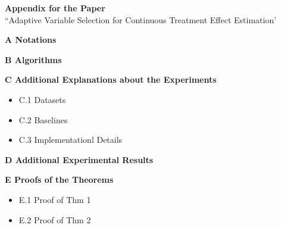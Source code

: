 \documentclass[twoside]{article}
\theoremstyle{plain}
\theoremstyle{definition}
\theoremstyle{remark}
\newtheorem{proof sketch}[theorem]{Proof Sketch}
\begin{document}
\begin{center}
  {\fontsize{16pt}{18pt}\selectfont\bfseries\color{darkblue} Appendix for the Paper} \\[0.6em]
  {\fontsize{14pt}{16pt}\selectfont \color{darkblue} ``Adaptive Variable Selection for Continuous Treatment Effect Estimation'} \\[1.5em]
\end{center}
{\color{darkblue}
\textbf{A \quad Notations}  
\vspace{-0.5em}  

\textbf{B \quad Algorithms}  
\vspace{0.5em}  

\textbf{C \quad Additional Explanations about the Experiments}  
\vspace{-0.5em}  
\begin{itemize}[leftmargin=1.5em, itemsep=0em]
    \item C.1 \quad Datasets
    \item C.2 \quad Baselines
    \item C.3 \quad Implementationl Details
\end{itemize}

\textbf{D \quad Additional Experimental Results} 
\vspace{0.5em}  

\textbf{E \quad Proofs of the Theorems}  
\vspace{-0.5em}  
\begin{itemize}[leftmargin=1.5em, itemsep=0em]
    \item E.1 \quad Proof of Thm 1
    \item E.2 \quad Proof of Thm 2
\end{itemize}}
\newpage
\end{document}
